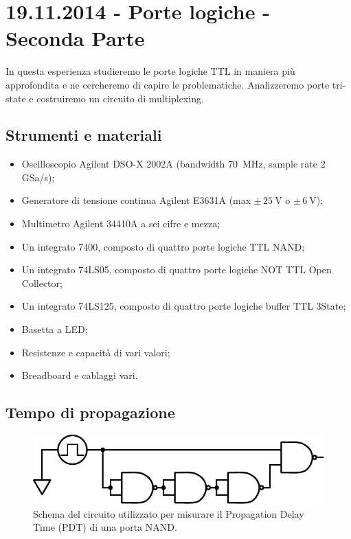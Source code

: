\section{19.11.2014 - Porte logiche - Seconda Parte}

In questa esperienza studieremo le porte logiche TTL in maniera più approfondita e ne cercheremo di capire le problematiche. Analizzeremo porte tri-state e costruiremo un circuito di multiplexing.

\subsection*{Strumenti e materiali}

\begin{itemize} [noitemsep]
	\item Oscilloscopio Agilent DSO-X 2002A (bandwidth \SI{70}{\mega\hertz}, sample rate \num{2} GSa/s);
	\item Generatore di tensione continua Agilent E3631A (max $\pm \, \SI{25}{\volt}$ o $\pm \, \SI{6}{\volt}$);
	\item Multimetro Agilent 34410A a sei cifre e mezza;
	\item Un integrato 7400, composto di quattro porte logiche TTL NAND; %
	\item Un integrato 74LS05, composto di quattro porte logiche NOT TTL Open Collector;
	\item Un integrato 74LS125, composto di quattro porte logiche buffer TTL 3State;
	\item Basetta a LED;		
	\item Resistenze e capacità di vari valori;
	\item Breadboard e cablaggi vari.
\end{itemize}

\subsection{Tempo di propagazione}

\begin{figure}
\centering
\includegraphics[width=.4\textwidth]{../E10/latex/delay.pdf}
\caption{Schema del circuito utilizzato per misurare il Propagation Delay Time (PDT) di una porta NAND.}
\label{cir10:delay}
\end{figure}


